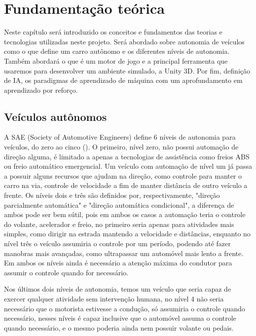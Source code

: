 \chapter{Fundamentação teórica}
Neste capítulo será introduzido os conceitos e fundamentos das teorias e tecnologias utilizadas neste projeto. Será abordado sobre autonomia de veículos como o que define um carro autônomo e os diferentes níveis de autonomia. Também abordará o que é um motor de jogo e a principal ferramenta que usaremos para desenvolver um ambiente simulado, a Unity 3D. Por fim, definição de IA, os paradigmas de aprendizado de máquina com um aprofundamento em aprendizado por reforço.

\section{Veículos autônomos}
A SAE (Society of Automotive Engineers) define 6 níveis de autonomia para veículos, do zero ao cinco (). O primeiro, nível zero, não possui automação de direção alguma, é limitado a apenas a tecnologias de assistência como freios ABS ou freio automático emergencial. Um veículo com automação de nível um já passa a possuir alguns recursos que ajudam na direção, como controle para manter o carro na via, controle de velocidade a fim de manter distância de outro veículo a frente. Os níveis dois e três são definidos por, respectivamente, "direção parcialmente automática" e "direção automática condicional", a diferença de ambos pode ser bem sútil, pois em ambos os casos a automação teria o controle do volante, acelerador e freio, no primeiro seria apenas para atividades mais simples, como dirigir na estrada mantendo a velocidade e distâncias, enquanto no nível três o veículo assumiria o controle por um período, podendo até fazer manobras mais avançadas, como ultrapassar um automóvel mais lento a frente. Em ambos os níveis ainda é necessário a atenção máxima do condutor para assumir o controle quando for necessário.

Nos últimos dois níveis de autonomia, temos um veículo que seria capaz de exercer qualquer atividade sem intervenção humana, no nível 4 não seria necessário que o motorista estivesse a condução, só assumiria o controle quando necessário, nesses níveis é capaz inclusive que o automóvel assuma o controle quando necessário, e o mesmo poderia ainda nem possuir volante ou pedais.


